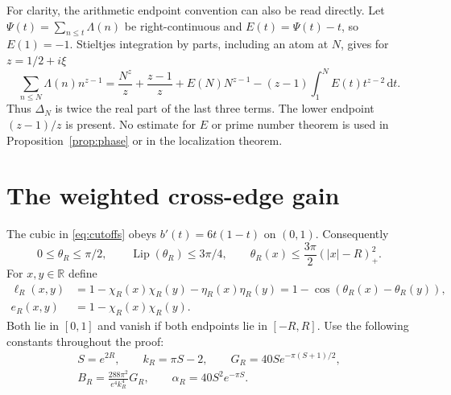 \documentclass[11pt]{article}
\theoremstyle{remark}\newtheorem{remark}[theorem]{Remark}
\newcommand{\R}{\mathbb R}
\newcommand{\dd}{\,\mathrm d}
\numberwithin{equation}{section}
\begin{document}
For clarity, the arithmetic endpoint convention can also be read directly.
Let $\Psi(t)=\sum_{n\le t}\Lambda(n)$ be right-continuous and
$E(t)=\Psi(t)-t$, so $E(1)=-1$. Stieltjes integration by parts, including
an atom at $N$, gives for $z=1/2+i\xi$
\begin{equation}\label{eq:abel}
 \sum_{n\le N}\Lambda(n)n^{z-1}
 =\frac{N^z}{z}+\frac{z-1}{z}+E(N)N^{z-1}
       -(z-1)\int_1^N E(t)t^{z-2}\dd t.
\end{equation}
Thus $\Delta_N$ is twice the real part of the last three terms. The lower
endpoint $(z-1)/z$ is present. No estimate for $E$ or prime number theorem
is used in Proposition~\ref{prop:phase} or in the localization theorem.

\section{The weighted cross-edge gain}\label{sec:cross-edge}

The cubic in \eqref{eq:cutoffs} obeys $b'(t)=6t(1-t)$ on $(0,1)$.
Consequently
\begin{equation}\label{eq:angle-bounds}
 0\le\theta_R\le\pi/2,\qquad
 \operatorname{Lip}(\theta_R)\le3\pi/4,\qquad
 \theta_R(x)\le\frac{3\pi}{2}(|x|-R)_+^2.
\end{equation}
For $x,y\in\R$ define
\begin{align}
 \ell_R(x,y)&=1-\chi_R(x)\chi_R(y)-\eta_R(x)\eta_R(y)
             =1-\cos(\theta_R(x)-\theta_R(y)),\label{eq:ell}\\
 e_R(x,y)&=1-\chi_R(x)\chi_R(y).\label{eq:edge-e}
\end{align}
Both lie in $[0,1]$ and vanish if both endpoints lie in $[-R,R]$.
Use the following constants throughout the proof:
\begin{equation}\label{eq:constants}
 \begin{gathered}
 S=e^{2R},\qquad k_R=\pi S-2,\qquad
 G_R=40S e^{-\pi(S+1)/2},\\
 B_R=\frac{288\pi^2}{e^4k_R^4}G_R,\qquad
 \alpha_R=40S^2e^{-\pi S}.
 \end{gathered}
\end{equation}
\end{document}
